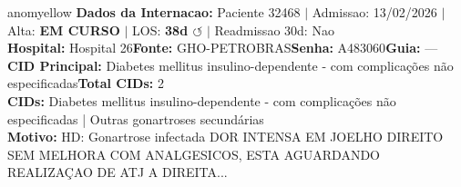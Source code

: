 \documentclass[a4paper,10pt]{article}
\begin{document}
\begin{anomalycard}[Internacao 165440 | GHO-PETROBRAS | MODERADO (z=2.98)]{anomyellow}
\textbf{Dados da Internacao:} Paciente 32468 $\mid$ Admissao: 13/02/2026 $\mid$ Alta: \textcolor{anomorange}{\textbf{EM CURSO}} $\mid$ LOS: \textbf{38d \textcolor{anomorange}{$\circlearrowleft$}} $\mid$ Readmissao 30d: Nao\\
\textbf{Hospital:} Hospital 26\quad\textbf{Fonte:} GHO-PETROBRAS\quad\textbf{Senha:} A483060\quad\textbf{Guia:} ---\\
\textbf{CID Principal:} {\small Diabetes mellitus insulino-dependente - com complicações não especificadas}\quad\textbf{Total CIDs:} 2\\

\textbf{CIDs:} {\scriptsize Diabetes mellitus insulino-dependente - com complicações não especificadas | Outras gonartroses secundárias}\\

\textbf{Motivo:} {\scriptsize HD: Gonartrose infectada  DOR INTENSA EM JOELHO DIREITO SEM MELHORA COM ANALGESICOS, ESTA AGUARDANDO REALIZAÇAO DE ATJ A DIREITA...}\\


\end{anomalycard}
\end{document}

